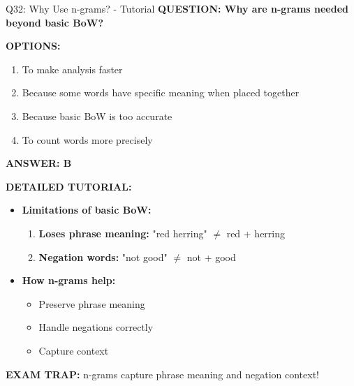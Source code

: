 \documentclass[8pt]{beamer}
\begin{document}
	\begin{frame}{Q32: Why Use n-grams? - Tutorial}
		\fontsize{6.5}{7.5}\selectfont
		\textbf{QUESTION: Why are n-grams needed beyond basic BoW?}
		
		\vspace{0.1cm}
		\textbf{OPTIONS:}
		\begin{enumerate}
			\item To make analysis faster
			\item Because some words have specific meaning when placed together
			\item Because basic BoW is too accurate
			\item To count words more precisely
		\end{enumerate}
		
		\vspace{0.1cm}
		\textcolor{myblue}{\textbf{ANSWER: B}}
		
		\vspace{0.1cm}
		\textbf{DETAILED TUTORIAL:}
		\begin{itemize}
			\item \textbf{Limitations of basic BoW:}
			\begin{enumerate}
				\item \textbf{Loses phrase meaning:} "red herring" $\neq$ red + herring
				\item \textbf{Negation words:} "not good" $\neq$ not + good
			\end{enumerate}
			\item \textbf{How n-grams help:}
			\begin{itemize}
				\item Preserve phrase meaning
				\item Handle negations correctly
				\item Capture context
			\end{itemize}
		\end{itemize}
		
		\textcolor{myred}{\textbf{EXAM TRAP:}} n-grams capture \textcolor{myblue}{phrase meaning and negation context}!
	\end{frame}
	
\end{document}
